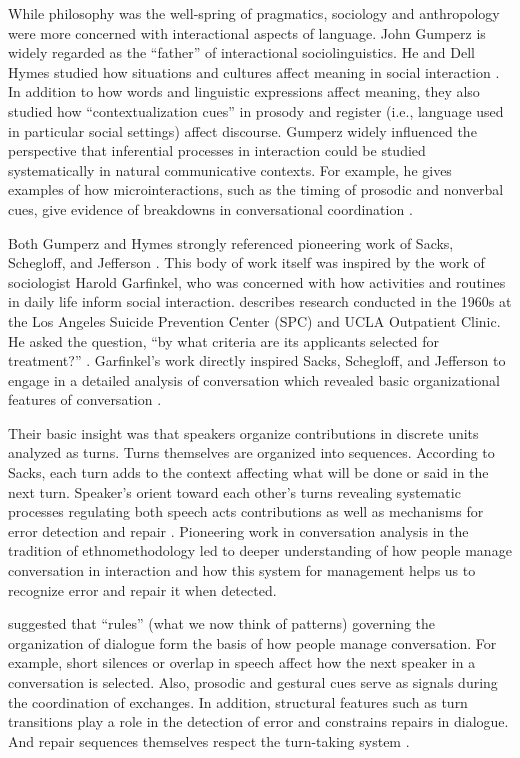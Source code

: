 While philosophy was the well-spring of pragmatics, sociology and anthropology were more concerned with interactional aspects of language. John Gumperz is widely regarded as the ``father'' of interactional sociolinguistics. He and Dell Hymes studied how situations and cultures affect meaning in social interaction  \citep{Gumperz:1982tc,Hymes:1974wr}.  In addition to how words and linguistic expressions affect meaning, they also studied how ``contextualization cues'' in prosody and register (i.e., language used in particular social settings) affect discourse. Gumperz widely influenced the perspective that inferential processes in interaction could be studied systematically in natural communicative contexts. For example, he gives examples of how microinteractions, such as the timing of prosodic and nonverbal cues, give evidence of breakdowns in conversational coordination  \citep{Gumperz:1982tc}. 

Both Gumperz and Hymes strongly referenced pioneering work of Sacks, Schegloff, and Jefferson  \citep{Schegloff:1973tg,Sacks:1974uy,Schegloff:1977tc,Jefferson:1972ta}.  This body of work itself was inspired by the work of sociologist Harold Garfinkel, who was concerned with how activities and routines in daily life inform social interaction.  \cite{Garfinkel:1967vn}  describes research conducted in the 1960s at the Los Angeles Suicide Prevention Center (SPC) and UCLA Outpatient Clinic. He asked the question, ``by what criteria are its applicants selected for treatment?''  \citep[p. 18]{Garfinkel:1967vn}.  Garfinkel's work directly inspired Sacks, Schegloff, and Jefferson to engage in a detailed analysis of conversation which revealed basic organizational features of conversation  \citep{Sacks:1974uy}.  

Their basic insight was that speakers organize contributions in discrete units analyzed as turns. Turns themselves are organized into sequences. According to Sacks, each turn adds to the context affecting what will be done or said in the next turn. Speaker's orient toward each other's turns revealing systematic processes regulating both speech acts contributions as well as mechanisms for error detection and repair  \citep{Levinson:1983ww}.  Pioneering work in conversation analysis in the tradition of ethnomethodology led to deeper understanding of how people manage conversation in interaction and how this system for management helps us to recognize error and repair it when detected. 

 \cite*{Sacks:1974uy}  suggested that ``rules'' (what we now think of patterns) governing the organization of dialogue form the basis of how people manage conversation. For example, short silences or overlap in speech affect how the next speaker in a conversation is selected. Also, prosodic and gestural cues serve as signals during the coordination of exchanges. In addition, structural features such as turn transitions play a role in the detection of error and constrains repairs in dialogue. And repair sequences themselves respect the turn-taking system  \citep{Schegloff:1977tc}. 

